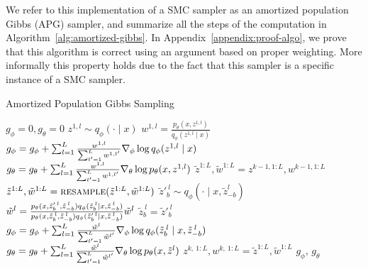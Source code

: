 \documentclass{article}
\theoremstyle{definition}
\begin{document}
We refer to this implementation of a SMC sampler as an amortized population Gibbs (APG) sampler, and summarize all the steps of the computation in Algorithm~\ref{alg:amortized-gibbs}. In Appendix~\ref{appendix:proof-algo}, we prove that this algorithm is correct using an argument based on proper weighting. More informally this property holds due to the fact that this sampler is a specific instance of a SMC sampler. 

\begin{algorithm}[!tb]
  \caption{Amortized Population Gibbs Sampling}
  \label{alg:amortized-gibbs}
\begin{algorithmic}[1]
\small
  \State $g_\phi = 0, g_\theta = 0$\label{line:init-grad}
  \label{line:rws-loop}
      \State $z^{1,l} \sim q_\phi(\cdot \mid x)$\label{line:rws-propose}
      \State $w^{1,l} = \frac{p_\theta(x, z^{1,l})}{q_\phi(z^{1,l} \mid x)}$\label{line:rws-weight}
  \EndFor
  \State $g_\phi = g_\phi + \sum_{l = 1}^L \frac{w^{1,l}}{\sum_{l' = 1}^L w^{1,l'}} \nabla_\phi \log q_\phi(z^{1,l} \mid x)$\label{line:rws-grad-phi}
  \State $g_\theta = g_\theta + \sum_{l = 1}^L \frac{w^{1,l}}{\sum_{l' = 1}^L w^{1,l'}} \nabla_\theta \log p_\theta(x, z^{1,l})$\label{line:rws-grad-theta}
  \label{line:sweep-loop}
    \State $\tilde{z}^{1:L}, \tilde{w}^{1:L} = z^{k-1,1:L}, w^{k-1,1:L}$ \label{line:apg-sweep-begin}
    \label{line:block-loop}
      \State $\tilde{z}^{1:L}, \tilde{w}^{1:L}=\textsc{resample}(\tilde{z}^{1:L}, \tilde{w}^{1:L})$\label{line:resample} 
        \label{line:apg-sample-loop}
          \State $\tilde{z}'^{\:l}_b \sim q_\phi(\cdot \mid x, \tilde{z}_{-b}^l)$\label{line:apg-propose}
          \State \label{line:apg-weight} $\tilde{w}^l = \frac{p_\theta(x, \tilde{z}'^{\:l}_{b}, \tilde{z}^{\:l}_{-b}) q_\phi(\tilde{z}^{\:l}_b \mid x, \tilde{z}^{\:l}_{-b})}{p_\theta(x, \tilde{z}^{\:l}_b, \tilde{z}^{\:l}_{-b}) q_\phi(\tilde{z}'^{\:l}_b \mid x, \tilde{z}^{\:l}_{-b})}\tilde{w}^l$ 
          \State \label{line:apg-reassign}$\tilde{z}^{\:l}_b = \tilde{z}'^{\:l}_b$ 
      \EndFor
      \State $g_\phi=g_\phi+ \sum_{l = 1}^L\frac{\tilde{w}^l}{\sum_{l'= 1}^L \tilde{w}^{l'}} \nabla_\phi\log q_\phi(\tilde{z}^{\:l}_b \mid x, \tilde{z}^{\:l}_{-b})$\label{line:apg-grad-phi}
      \State $g_\theta = g_\theta + \sum_{l = 1}^L \frac{\tilde{w}^l}{\sum_{l' = 1}^L \tilde{w}^{l'}} \nabla_\theta \log p_\theta(x, \tilde{z}^l)$ \label{line:apg-grad-theta}
     \EndFor
     \State $z^{k,\:1:L}, w^{k,\:1:L} = \tilde{z}^{1:L}, \tilde{w}^{1:L}$\label{line:apg-sweep-end}
     \vspace{0.5em}
  \EndFor
  \Return $g_\phi$, $g_\theta$
\end{algorithmic}
\end{algorithm}
\fi
\end{document}
